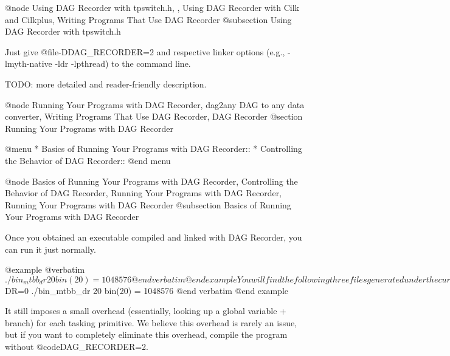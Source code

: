 @node Using DAG Recorder with tpswitch.h,  , Using DAG Recorder with Cilk and Cilkplus, Writing Programs That Use DAG Recorder
@subsection Using DAG Recorder with tpswitch.h

Just give @file{-DDAG_RECORDER=2} 
and respective linker options (e.g., -lmyth-native -ldr -lpthread)
to the command line.

TODO: more detailed and reader-friendly description.

@node Running Your Programs with DAG Recorder, dag2any DAG to any data converter, Writing Programs That Use DAG Recorder, DAG Recorder
@section Running Your Programs with DAG Recorder

@menu
* Basics of Running Your Programs with DAG Recorder::
* Controlling the Behavior of DAG Recorder::
@end menu

@node Basics of Running Your Programs with DAG Recorder, Controlling the Behavior of DAG Recorder, Running Your Programs with DAG Recorder, Running Your Programs with DAG Recorder
@subsection Basics of Running Your Programs with DAG Recorder

Once you obtained an executable compiled and linked with DAG Recorder, you can run it just normally.  

@example 
@verbatim
$ ./bin_mtbb_dr 20
bin(20) = 1048576
@end verbatim
@end example

You will find the following three files generated under the current directory.
@itemize @bullet
@item @file{00dr.dag} --- The DAG file. This is the primary file generated by DAG Recorder, from which other files are derived
@item @file{00dr.gpl} --- The parallelism file.  This is a file showing the actual and available parallelism, in a gnuplot format. 
@item @file{00dr.stat} --- The summary stat file.  This is a text file showing, among others, the number of tasks, total work time (time spent in the application code), critical path, the number of steals, etc.  The contents of this file will be explained later.
@end itemize

Run this program with setting environment variable @code{DR=0}, and you
can run the program with DAG Recorder turned off.

@example 
@verbatim
$ DR=0 ./bin_mtbb_dr 20
bin(20) = 1048576
@end verbatim
@end example

It still imposes a small overhead (essentially, looking up a global
variable + branch) for each tasking primitive.  We believe this overhead
is rarely an issue, but if you want to completely eliminate this
overhead, compile the program without @code{DAG_RECORDER=2}.

